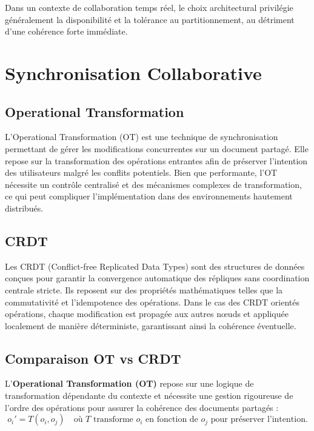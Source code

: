 \documentclass[a4paper,oneside,12pt]{book}
\begin{document}
Dans un contexte de collaboration temps réel, le choix architectural privilégie généralement la disponibilité et la tolérance au partitionnement, au détriment d’une cohérence forte immédiate.

\chapter{Synchronisation Collaborative}\label{chap2}

\section{Operational Transformation}

L’Operational Transformation (OT) est une technique de synchronisation permettant de gérer les modifications concurrentes sur un document partagé.  
Elle repose sur la transformation des opérations entrantes afin de préserver l’intention des utilisateurs malgré les conflits potentiels.
Bien que performante, l’OT nécessite un contrôle centralisé et des mécanismes complexes de transformation, ce qui peut compliquer l’implémentation dans des environnements hautement distribués.

\section{CRDT}

Les CRDT (Conflict-free Replicated Data Types) sont des structures de données conçues pour garantir la convergence automatique des répliques sans coordination centrale stricte.  
Ils reposent sur des propriétés mathématiques telles que la commutativité et l’idempotence des opérations.  
Dans le cas des CRDT orientés opérations, chaque modification est propagée aux autres nœuds et appliquée localement de manière déterministe, garantissant ainsi la cohérence éventuelle.
\section{Comparaison OT vs CRDT}

L'\textbf{Operational Transformation (OT)} repose sur une logique de transformation dépendante du contexte et nécessite une gestion rigoureuse de l'ordre des opérations pour assurer la cohérence des documents partagés :
\[
o_i' = T(o_i, o_j) \quad \text{où $T$ transforme $o_i$ en fonction de $o_j$ pour préserver l’intention.}
\]
\\
\end{document}
